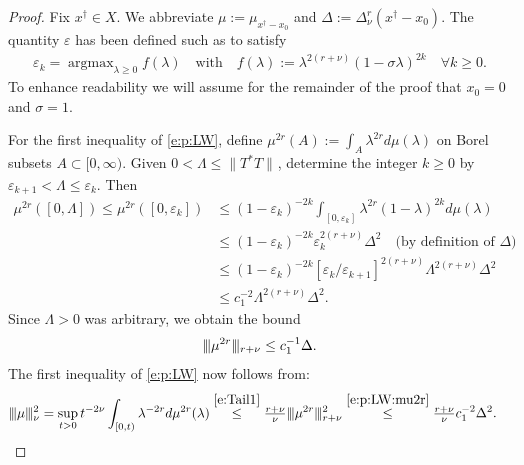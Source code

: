 \documentclass[10pt, a4paper]{iopart}
\newcommand{\argmax}{\mathop{\mathrm{argmax}}}
\newcommand{\norm}[2]{     \| #1       \|_{ #2 }}
\newcommand{\normiii}[2]{\vert\kern-0.25ex\vert\kern-0.25ex\vert #1 \vert\kern-0.25ex \vert\kern-0.25ex\vert_{ #2 }}
\theoremstyle{remark}
\theoremstyle{definition}
\begin{document}
\begin{proof}
	Fix $x^\dag \in X$.
	We abbreviate
	$\mu := \mu_{x^\dag - x_0}$ 
	and
	$\Delta := \Delta_{\nu}^r(x^\dag - x_0)$.
	The quantity $\varepsilon$ has been defined
	such as
	to satisfy
	\begin{align} 
		\varepsilon_{k}
		=
		\argmax_{\lambda \geq 0}
		f(\lambda)
		\quad\text{with}\quad
		f(\lambda) := \lambda^{2(r + \nu)} (1 - \sigma \lambda)^{2k}
		\quad
		\forall k \geq 0
		.
	\end{align}
	To enhance readability we will assume 
	for the remainder of the proof
	that $x_0 = 0$ and $\sigma = 1$.
	
	
	For the first inequality of \eqref{e:p:LW},
	define $\mu^{2r}(A) := \int_A \lambda^{2 r} d \mu(\lambda)$
	on Borel subsets $A \subset [0, \infty)$.
	Given $0 < \Lambda \leq \norm{T^* T}{}$,
	determine the integer $k \geq 0$ 
	by
	$\varepsilon_{k+1} < \Lambda \leq \varepsilon_{k}$.
	Then
	\begin{align}
		\mu^{2 r}([0, \Lambda])
		\leq
		\mu^{2 r}([0, \varepsilon_{k}])
	& \leq
		(1 - \varepsilon_{k})^{-2 k}
		\int_{[0, \varepsilon_{k}]}
		\lambda^{2 r}
		(1 - \lambda)^{2 k}
		d\mu(\lambda)
	\\
	& \leq
		(1 - \varepsilon_{k})^{-2 k}
		\varepsilon_{k}^{2 (r + \nu)}
		\Delta^2
		\quad
		\text{(by definition of $\Delta$)}
	\\
	& \leq
		(1 - \varepsilon_{k})^{-2 k}
		\left[
			\varepsilon_{k} / \varepsilon_{k+1}
		\right]^{2 (r + \nu)}
		\Lambda^{2(r + \nu)}
		\Delta^2
	\\
	&
	\leq
		c_1^{-2} 
		\Lambda^{2(r + \nu)}
		\Delta^2
		.
	\end{align}
	Since $\Lambda > 0$ was arbitrary,
	we obtain the bound
	\begin{align}
	\label{e:p:LW:mu2r}
		\normiii{\mu^{2 r}}{r + \nu}
	\leq 
		c_1^{-1}
		\Delta
		.
	\end{align}
	The first inequality of \eqref{e:p:LW}
	now
	follows from:
	\begin{align}
		\normiii{\mu}{\nu}^2
	& =
		\sup_{t > 0}
		t^{-2 \nu}
		\int_{[0, t)} 
		\lambda^{-2 r}
		d\mu^{2 r}(\lambda)
	\stackrel{\eqref{e:Tail1}}{\leq}
		\tfrac{r + \nu}{\nu}
		\normiii{\mu^{2 r}}{r + \nu}^2
	\stackrel{\eqref{e:p:LW:mu2r}}{\leq}
		\tfrac{r + \nu}{\nu}
		c_1^{-2}
		\Delta^2
		.
	\end{align}
	

\end{proof}
\end{document}
